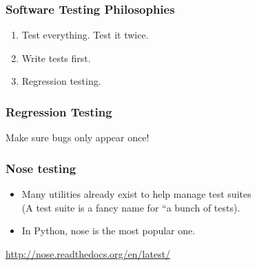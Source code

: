 \begin{frame}[fragile]
\frametitle{Software Testing Philosophies}

\begin{enumerate}
\item Test everything. Test it twice.
\item Write tests first.
\item Regression testing.
\end{enumerate}
\end{frame}

\begin{frame}[fragile]
\frametitle{Regression Testing}

Make sure bugs only appear once!

\end{frame}

\begin{frame}[fragile]
\frametitle{Nose testing}

\begin{itemize}
\item Many utilities already exist to help manage test suites\\
(A test suite is a fancy name for ``a bunch of tests).
\item In Python, \alert{nose} is the most popular one.
\end{itemize}

\url{http://nose.readthedocs.org/en/latest/}


\end{frame}




